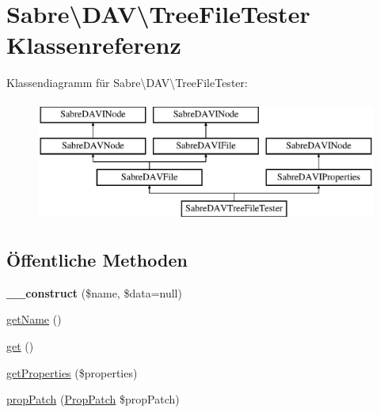 \hypertarget{class_sabre_1_1_d_a_v_1_1_tree_file_tester}{}\section{Sabre\textbackslash{}D\+AV\textbackslash{}Tree\+File\+Tester Klassenreferenz}
\label{class_sabre_1_1_d_a_v_1_1_tree_file_tester}
Klassendiagramm für Sabre\textbackslash{}D\+AV\textbackslash{}Tree\+File\+Tester\+:\begin{figure}[H]
\begin{center}
\leavevmode
\includegraphics[height=4.000000cm]{class_sabre_1_1_d_a_v_1_1_tree_file_tester}
\end{center}
\end{figure}
\subsection*{Öffentliche Methoden}
\begin{DoxyCompactItemize}
\item 
\mbox{\label{class_sabre_1_1_d_a_v_1_1_tree_file_tester_ab8f858eeb0693f64224e1388a1fcf09b}} 
{\bfseries \+\_\+\+\_\+construct} (\$name, \$data=null)
\item 
\mbox{\hyperlink{class_sabre_1_1_d_a_v_1_1_tree_file_tester_a19625a861e0ecb02a986f61d3e097075}{get\+Name}} ()
\item 
\mbox{\hyperlink{class_sabre_1_1_d_a_v_1_1_tree_file_tester_a38879bb7792e5e5d2413aa142a46b466}{get}} ()
\item 
\mbox{\hyperlink{class_sabre_1_1_d_a_v_1_1_tree_file_tester_a5339786bcd3f76824b00e09f0261036e}{get\+Properties}} (\$properties)
\item 
\mbox{\hyperlink{class_sabre_1_1_d_a_v_1_1_tree_file_tester_a474b2d04545674413ad86531abcc2105}{prop\+Patch}} (\mbox{\hyperlink{class_sabre_1_1_d_a_v_1_1_prop_patch}{Prop\+Patch}} \$prop\+Patch)
\end{DoxyCompactItemize}
